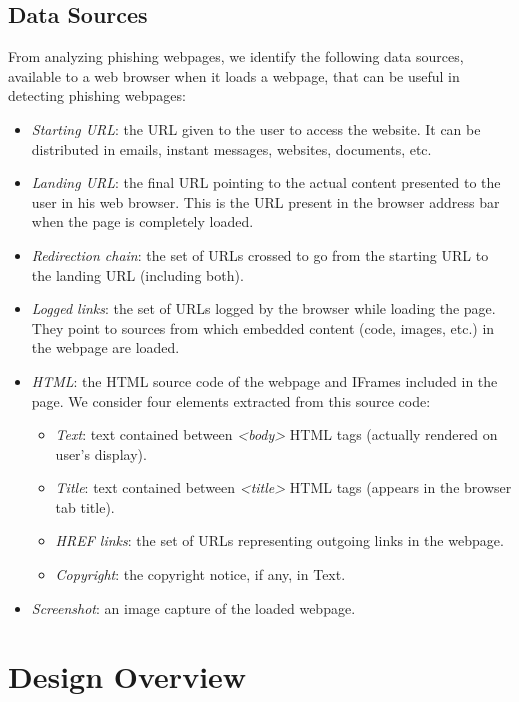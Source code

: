 \documentclass[10pt,conference,compsocconf,letterpaper]{IEEEtran}
\begin{document}
\subsection{Data Sources}
\label{subsec:data_source}

From analyzing phishing webpages, we identify the following data sources, available to a web browser when it loads a webpage, that can be useful in detecting phishing webpages:

\begin{itemize}
	\item \emph{Starting URL}: the URL given to the user to access the website. It can be distributed in emails, instant messages, websites, documents, etc.
	\item \emph{Landing URL}: the final URL pointing to the actual content presented to the user in his web browser. This is the URL present in the browser address bar when the page is completely loaded.
	\item \emph{Redirection chain}: the set of URLs crossed to go from the starting URL to the landing URL (including both).
	\item \emph{Logged links}: the set of URLs logged by the browser while loading the page. They point to sources from which embedded content (code, images, etc.) in the webpage are loaded.
	\item \emph{HTML}: the HTML source code of the webpage and IFrames included in the page. We consider four elements extracted from this source code:
	\begin{itemize}
		\item \emph{Text}: text contained between \textit{\textless body\textgreater} HTML tags (actually rendered on user's display).
		\item \emph{Title}: text contained between \textit{\textless title\textgreater} HTML tags (appears in the browser tab title).
		\item \emph{HREF links}: the set of URLs representing outgoing links in the webpage.
		\item \emph{Copyright}: the copyright notice, if any, in Text.
	\end{itemize}
	\item \emph{Screenshot}: an image capture of the loaded webpage. 
\end{itemize}
\section{Design Overview}
\label{sec:design}
\end{document}
